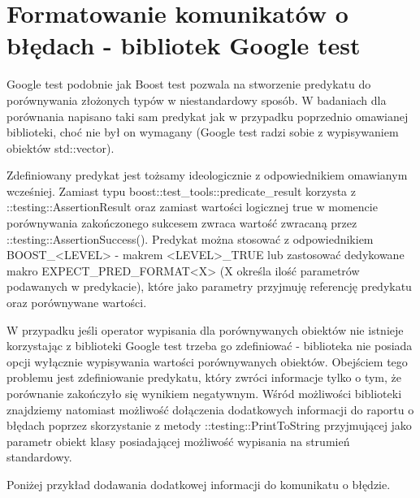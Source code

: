 \documentclass[12pt,a4paper,notitlepage]{report}
\begin{document}
\section{Formatowanie komunikatów o błędach - bibliotek Google test}

Google test podobnie jak Boost test pozwala na stworzenie predykatu do porównywania złożonych typów w niestandardowy sposób. W badaniach dla porównania napisano taki sam predykat jak w przypadku poprzednio omawianej biblioteki, choć nie był on wymagany (Google test radzi sobie z wypisywaniem obiektów std::vector).

Zdefiniowany predykat jest tożsamy ideologicznie z odpowiednikiem omawianym wcześniej. Zamiast typu boost::test{\_}tools::predicate{\_}result korzysta z ::testing::AssertionResult oraz zamiast wartości logicznej true w momencie porównywania zakończonego sukcesem zwraca wartość zwracaną przez ::testing::AssertionSuccess().
Predykat można stosować z odpowiednikiem BOOST{\_}<LEVEL> - makrem <LEVEL>{\_}TRUE lub zastosować dedykowane makro EXPECT{\_}PRED{\_}FORMAT<X> (X określa ilość parametrów podawanych w predykacie), które jako parametry przyjmuję referencję predykatu oraz porównywane wartości.

			

W przypadku jeśli operator wypisania dla porównywanych obiektów nie istnieje korzystając z biblioteki Google test trzeba go zdefiniować - biblioteka nie posiada opcji wyłącznie wypisywania wartości porównywanych obiektów. Obejściem tego problemu jest zdefiniowanie predykatu, który zwróci informacje tylko o tym, że porównanie zakończyło się wynikiem negatywnym.
Wśród możliwości biblioteki znajdziemy natomiast możliwość dołączenia dodatkowych informacji do raportu o błędach poprzez skorzystanie z metody ::testing::PrintToString przyjmującej jako parametr obiekt klasy posiadającej możliwość wypisania na strumień standardowy.

Poniżej przykład dodawania dodatkowej informacji do komunikatu o błędzie.

			
\end{document}
